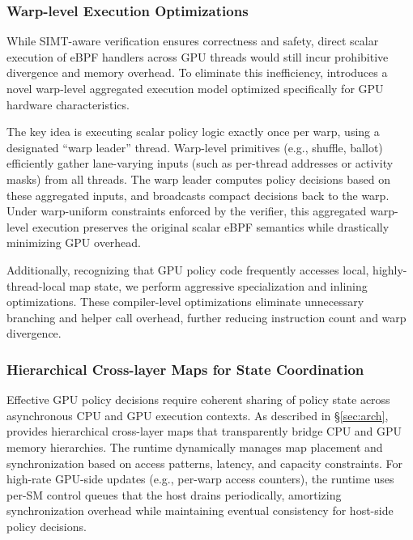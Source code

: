 \subsubsection{Warp-level Execution Optimizations}

While SIMT-aware verification ensures correctness and safety, direct scalar execution of eBPF handlers across GPU threads would still incur prohibitive divergence and memory overhead. To eliminate this inefficiency, \sys introduces a novel warp-level aggregated execution model optimized specifically for GPU hardware characteristics.

The key idea is executing scalar policy logic exactly once per warp, using a designated ``warp leader'' thread. Warp-level primitives (e.g., shuffle, ballot) efficiently gather lane-varying inputs (such as per-thread addresses or activity masks) from all threads. The warp leader computes policy decisions based on these aggregated inputs, and broadcasts compact decisions back to the warp. Under warp-uniform constraints enforced by the verifier, this aggregated warp-level execution preserves the original scalar eBPF semantics while drastically minimizing GPU overhead.

Additionally, recognizing that GPU policy code frequently accesses local, highly-thread-local map state, we perform aggressive specialization and inlining optimizations. These compiler-level optimizations eliminate unnecessary branching and helper call overhead, further reducing instruction count and warp divergence.

\subsubsection{Hierarchical Cross-layer Maps for State Coordination}

Effective GPU policy decisions require coherent sharing of policy state across asynchronous CPU and GPU execution contexts. As described in \S\ref{sec:arch}, \sys provides hierarchical cross-layer maps that transparently bridge CPU and GPU memory hierarchies. The runtime dynamically manages map placement and synchronization based on access patterns, latency, and capacity constraints. For high-rate GPU-side updates (e.g., per-warp access counters), the runtime uses per-SM control queues that the host drains periodically, amortizing synchronization overhead while maintaining eventual consistency for host-side policy decisions.
